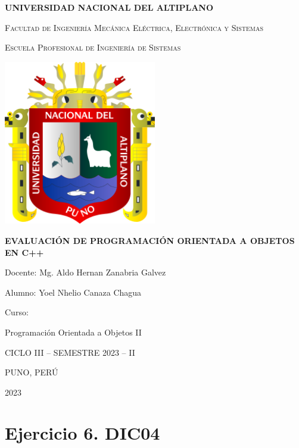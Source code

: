 \documentclass[11pt,a4paper]{article}
\begin{document}
\begin{titlepage}
\centering


{\bfseries\LARGE UNIVERSIDAD NACIONAL DEL ALTIPLANO\par}
{\scshape\LARGE Facultad de Ingeniería Mecánica Eléctrica, Electrónica y Sistemas\par}
{\scshape\LARGE Escuela Profesional de Ingeniería de Sistemas\par}
\vspace{1cm}
{\includegraphics[width=0.5\textwidth]{images/1-unap.png}\par}
\vspace{0.5cm}
{\bfseries\LARGE EVALUACIÓN DE PROGRAMACIÓN ORIENTADA A OBJETOS EN C++\par}
\vspace{1cm}
{\LARGE Docente: Mg. Aldo Hernan Zanabria Galvez \par}
{\LARGE Alumno: Yoel Nhelio Canaza Chagua \par}
\vspace{1cm}
{\LARGE Curso: \par}
{\LARGE Programación Orientada a Objetos II \par}
\vspace{1cm}
{\LARGE CICLO III – SEMESTRE 2023 – II \par}
{\LARGE PUNO, PERÚ \par}
{\LARGE 2023 \par}


\end{titlepage}

\section{Ejercicio 6. DIC04}
\end{document}
